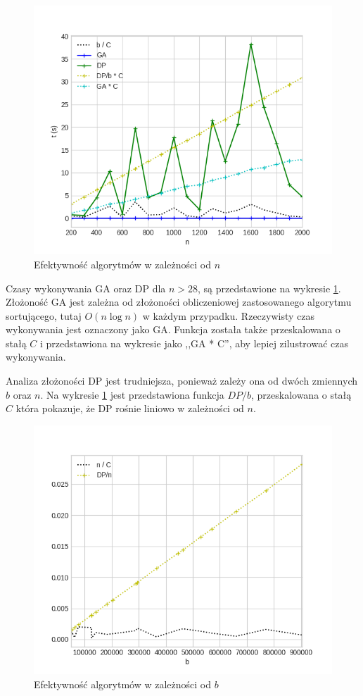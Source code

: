 \documentclass[12pt,twocolumn]{article}
\begin{document}
\begin{figure}[h]
	\includegraphics[width=\linewidth]{speed-n-big.png}
	\caption{Efektywność algorytmów w zależności od $n$ \label{speed_n_big}}
\end{figure}


Czasy wykonywania GA oraz DP dla $n > 28$, są przedstawione na wykresie \ref{speed_n_big}.
Złożoność GA jest zależna od złożoności obliczeniowej zastosowanego algorytmu sortującego,
tutaj $O(n \log n)$ w każdym przypadku. Rzeczywisty czas wykonywania jest oznaczony jako GA.
Funkcja została także przeskalowana o stałą $C$ i przedstawiona na wykresie jako ,,GA * C'',
aby lepiej zilustrować czas wykonywania.

Analiza złożoności DP jest trudniejsza, 
ponieważ zależy ona od dwóch zmiennych $b$ oraz $n$.
Na wykresie \ref{speed_n_big} jest przedstawiona funkcja $DP/b$,
przeskalowana o stałą $C$ która pokazuje, że 
DP rośnie liniowo w zależności od $n$.

\begin{figure}[h]
	\includegraphics[width=\linewidth]{speed-b-big.png}
	\caption{Efektywność algorytmów w zależności od $b$ \label{speed_b_big}}
\end{figure}
\end{document}
